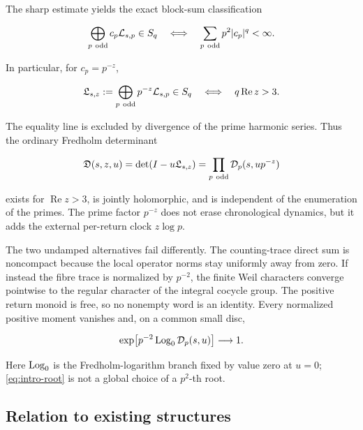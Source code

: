 The sharp estimate yields the exact block-sum classification

\begin{equation}
 \bigoplus_{p\ \odd}c_p\cL_{s,p}\in\Schatten q
 \quad\Longleftrightarrow\quad
 \sum_{p\ \odd}p^2|c_p|^q<\infty.
 \label{eq:intro-iff}
\end{equation}

In particular, for \(c_p=p^{-z}\),

\begin{equation}
 \fL_{s,z}:=\bigoplus_{p\ \odd}p^{-z}\cL_{s,p}
 \in\Schatten q
 \quad\Longleftrightarrow\quad
 q\operatorname{Re}z>3.
 \label{eq:intro-wall}
\end{equation}

The equality line is excluded by divergence of the prime harmonic series.
Thus the ordinary Fredholm determinant

\begin{equation}
 \mathfrak D(s,z,u)=\det(I-u\mathfrak L_{s,z})
 =\prod_{p\ \mathrm{odd}}\mathcal D_p(s,up^{-z})
 \label{eq:intro-product}
\end{equation}

exists for \(\operatorname{Re}z>3\), is jointly holomorphic, and is
independent of the enumeration of the primes.  The prime factor \(p^{-z}\)
does not erase chronological dynamics, but it adds the external per-return
clock \(z\log p\).

The two undamped alternatives fail differently.  The counting-trace direct
sum is noncompact because the local operator norms stay uniformly away from
zero.  If instead the fibre trace is normalized by \(p^{-2}\), the finite
Weil characters converge pointwise to the regular character of the integral
cocycle group.  The positive return monoid is free, so no nonempty word is an
identity.  Every normalized positive moment vanishes and, on a common small
disc,

\begin{equation}
 \exp\!\left[p^{-2}\operatorname{Log}_0\mathcal D_p(s,u)\right]\longrightarrow1.
 \label{eq:intro-root}
\end{equation}

Here \(\operatorname{Log}_0\) is the Fredholm-logarithm branch fixed by value zero at
\(u=0\); \cref{eq:intro-root} is not a global choice of a \(p^2\)-th root.

\subsection{Relation to existing structures}

